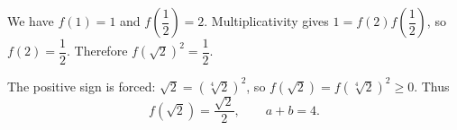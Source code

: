 We have $f(1)=1$ and $f(\dfrac{1}{2})=2$. Multiplicativity gives $1=f(2)f(\dfrac{1}{2})$, so $f(2)=\dfrac{1}{2}$. Therefore $f(\sqrt2)^2=\dfrac{1}{2}$.

The positive sign is forced: $\sqrt2=(\sqrt[4]2)^2$, so $f(\sqrt2)=f(\sqrt[4]2)^2\ge0$. Thus
\[
f(\sqrt2)=\dfrac{\sqrt2}{2},\qquad\boxed{a+b=4}.
\]
